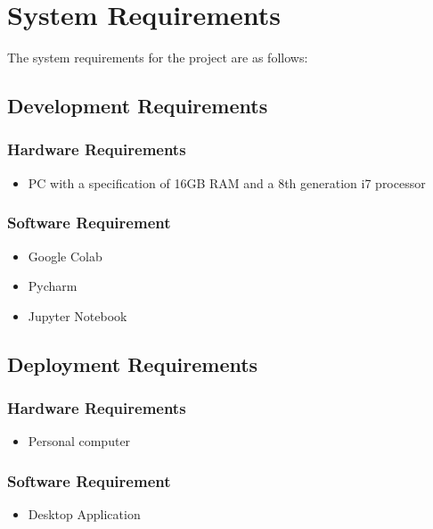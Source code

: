 \section{System Requirements}
The system requirements for the project are as follows:
\subsection{Development Requirements}

\subsubsection{Hardware Requirements}
\begin{itemize}
    \item   PC with a specification of 16GB RAM and a 8th generation i7 processor 
   
    
\end{itemize}

\subsubsection{Software Requirement}
\begin{itemize}
    \item Google Colab
    \item Pycharm
    \item Jupyter Notebook
    

    
\end{itemize}
\subsection{Deployment Requirements}

\subsubsection{Hardware Requirements}
\begin{itemize}
    \item  Personal computer

    
\end{itemize}

\subsubsection{Software Requirement}
\begin{itemize}
    \item Desktop Application
   

    
\end{itemize}

